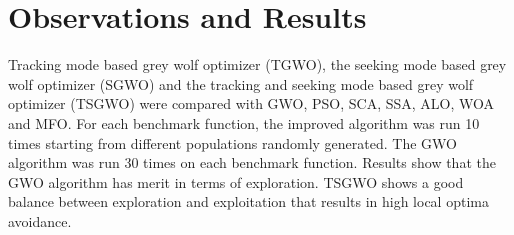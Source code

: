 \documentclass[11pt]{report}
\begin{document}
 \chapter{Observations and Results}

Tracking mode based grey wolf optimizer
(TGWO), the seeking mode based grey wolf optimizer
(SGWO) and the tracking and seeking mode based grey
wolf optimizer (TSGWO) were compared with GWO, PSO,
SCA, SSA, ALO, WOA and MFO. For each benchmark
function, the improved algorithm was run 10 times starting
from different populations randomly generated.
The  GWO  algorithm  was  run  30  times  on  each  benchmark  function.
Results show that the GWO algorithm has merit in terms of exploration.
TSGWO  shows  a  good  balance  between exploration and exploitation that results in high local optima avoidance. 
\end{document}

